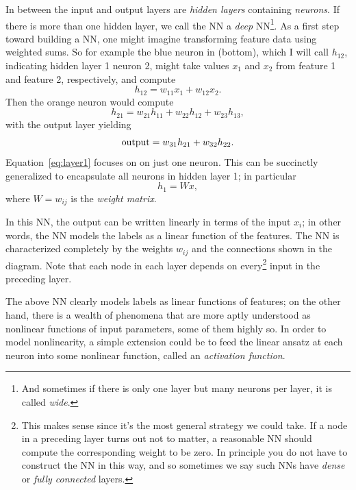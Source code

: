 In between the input and output layers are 
{\it hidden layers} containing {\it neurons}.
If there is more than one hidden layer, we call the NN a {\it deep}
NN\footnote{And sometimes if there is only one
layer but many neurons per layer, it is called {\it wide}.}.
As a first step toward building a NN, one might imagine transforming
feature data using weighted sums. So for example 
the blue neuron in  (bottom), which I will
call $h_{12}$, indicating hidden layer 1 neuron 2, might take values
$x_1$ and $x_2$ from feature 1 and feature 2, respectively, and compute
\begin{equation}\label{eq:layer1}
h_{12} = w_{11}x_1+w_{12}x_2.
\end{equation}
Then the orange neuron would compute
\begin{equation}
h_{21} = w_{21}h_{11}+w_{22}h_{12}+w_{23}h_{13},
\end{equation}
with the output layer yielding
\begin{equation}
{\rm output} = w_{31}h_{21}+w_{32}h_{22}.
\end{equation}
Equation~\eqref{eq:layer1} focuses on on just one neuron. This can be succinctly
generalized to encapsulate all neurons in hidden layer 1; in particular
\begin{equation}
h_1=W x,
\end{equation} 
where $W=w_{ij}$ is the {\it weight matrix}.

In this NN, the output can be written linearly in terms of the input $x_i$;
in other words, the NN models the labels as a linear function of the features.
The NN is characterized completely by the weights $w_{ij}$ and the connections
shown in the diagram. Note that each node in each layer depends on
every\footnote{This makes sense since it's the most
general strategy we could take. If a node in a preceding layer turns out
not to matter, a reasonable NN should compute the corresponding weight to be
zero. In principle you do not have to construct the NN in this way, and
so sometimes we say such NNs have {\it dense} or {\it fully connected}
layers.} input in the preceding layer.

The above NN clearly models labels as linear functions of features; on the other
hand, there is a wealth of phenomena that are more aptly understood as nonlinear
functions of input parameters, some of them highly so. In order to model
nonlinearity, a simple extension could be to feed the linear ansatz at each
neuron into some nonlinear function, called an {\it activation
function}.  

